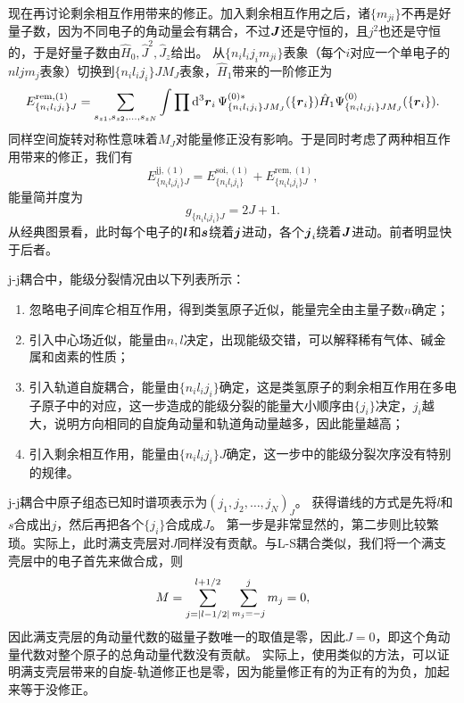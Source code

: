 \documentclass[UTF8, a4paper]{ctexart}
\begin{document}
现在再讨论剩余相互作用带来的修正。加入剩余相互作用之后，诸$\{m_{ji}\}$不再是好量子数，因为不同电子的角动量会有耦合，不过$\vb*{J}$还是守恒的，且$j^2$也还是守恒的，于是好量子数由$\hat{H}_0, \hat{J}^2, \hat{J}_z$给出。
从$\{n_i l_i j_i m_{ji}\}$表象（每个$i$对应一个单电子的$nl j m_j$表象）切换到$\{n_i l_i j_i\} J M_J$表象，$\hat{H}_1$带来的一阶修正为
\begin{equation}
    E^{\text{rem}, (1)}_{\{n_i l_i j_i\} J} = \sum_{s_{z1}, s_{z2}, \ldots, s_{zN}} \int \prod \dd[3]{\vb*{r}_i} \Psi^{(0) *}_{\{n_i l_i j_i\} J M_J}(\{\vb*{r}_i\}) \hat{H}_1 \Psi^{(0)}_{\{n_i l_i j_i\} J M_J}(\{\vb*{r}_i\}).
\end{equation}
同样空间旋转对称性意味着$M_J$对能量修正没有影响。于是同时考虑了两种相互作用带来的修正，我们有
\begin{equation}
    E^{\text{jj}, (1)}_{\{n_i l_i j_i\} J} = E^{\text{soi}, (1)}_{\{n_i l_i j_i\}} + E^{\text{rem}, (1)}_{\{n_i l_i j_i\} J},
\end{equation}
能量简并度为
\begin{equation}
    g_{\{n_i l_i j_i\}J} = 2J+1.
\end{equation}
从经典图景看，此时每个电子的$\vb*{l}$和$\vb*{s}$绕着$\vb*{j}$进动，各个$\vb*{j}_i$绕着$\vb*{J}$进动。前者明显快于后者。

j-j耦合中，能级分裂情况由以下列表所示：
\begin{enumerate}
    \item 忽略电子间库仑相互作用，得到类氢原子近似，能量完全由主量子数$n$确定；
    \item 引入中心场近似，能量由$n, l$决定，出现能级交错，可以解释稀有气体、碱金属和卤素的性质；
    \item 引入轨道自旋耦合，能量由$\{n_i l_i j_i\}$确定，这是类氢原子的剩余相互作用在多电子原子中的对应，这一步造成的能级分裂的能量大小顺序由$\{j_i\}$决定，$j_i$越大，说明方向相同的自旋角动量和轨道角动量越多，因此能量越高；
    \item 引入剩余相互作用，能量由$\{n_i l_i j_i\} J$确定，这一步中的能级分裂次序没有特别的规律。
\end{enumerate}

j-j耦合中原子组态已知时谱项表示为$(j_1, j_2, \ldots, j_N)_J$。
获得谱线的方式是先将$l$和$s$合成出$j$，然后再把各个$\{j_i\}$合成成$J$。
第一步是非常显然的，第二步则比较繁琐。实际上，此时满支壳层对$J$同样没有贡献。与L-S耦合类似，我们将一个满支壳层中的电子首先来做合成，则
\[
    M = \sum_{j=\abs{l-1/2}}^{l+1/2} \sum_{m_j=-j}^j m_j = 0,
\]
因此满支壳层的角动量代数的磁量子数唯一的取值是零，因此$J=0$，即这个角动量代数对整个原子的总角动量代数没有贡献。
实际上，使用类似的方法，可以证明满支壳层带来的自旋-轨道修正也是零，因为能量修正有的为正有的为负，加起来等于没修正。
\end{document}
